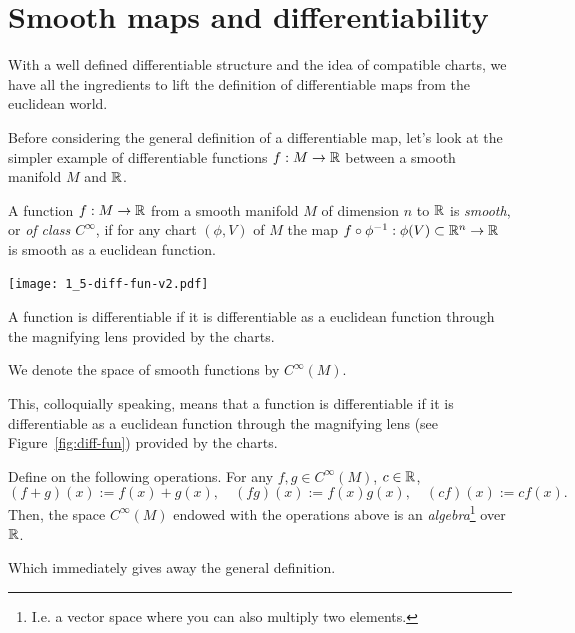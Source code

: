 \section{Smooth maps and differentiability}

With a well defined differentiable structure and the idea of compatible charts, we have all the ingredients to lift the definition of differentiable maps from the euclidean world.

Before considering the general definition of a differentiable map, let's look at the simpler example of differentiable functions $f:M\to\mathbb{R}$ between a smooth manifold $M$ and $\mathbb{R}$.

\begin{definition}
  A function $f:M\to\mathbb{R}$ from a smooth manifold $M$ of dimension $n$ to $\mathbb{R}$ is \emph{smooth}, or \emph{of class $C^\infty$}, if for any chart $(\phi, V)$ of $M$ the map $f\circ\phi^{-1}:\phi(V)\subset\mathbb{R}^n \to \mathbb{R}$ is smooth as a euclidean function.
  \begin{marginfigure}
    \texttt{[image: 1\_5-diff-fun-v2.pdf]}
    \label{fig:diff-fun}
    \caption{A function is differentiable if it is differentiable as a euclidean function through the magnifying lens provided by the charts.}
  \end{marginfigure}
  We denote the space of smooth functions by $C^\infty(M)$.
\end{definition}

This, colloquially speaking, means that a function is differentiable if it is differentiable as a euclidean function through the magnifying lens (see Figure~\ref{fig:diff-fun}) provided by the charts.

\begin{exercise}
  Define on the following operations.
  For any $f,g\in C^\infty(M)$, $c\in\mathbb{R}$,
  \begin{equation}
    (f+g)(x) := f(x) + g(x),\quad
    (fg)(x) := f(x) g(x),\quad
    (cf)(x) := c f(x).
  \end{equation}
  Then, the space $C^\infty(M)$ endowed with the operations above is an \emph{algebra}\footnote{I.e. a vector space where you can also multiply two elements.} over $\mathbb{R}$.
\end{exercise}

Which immediately gives away the general definition.

